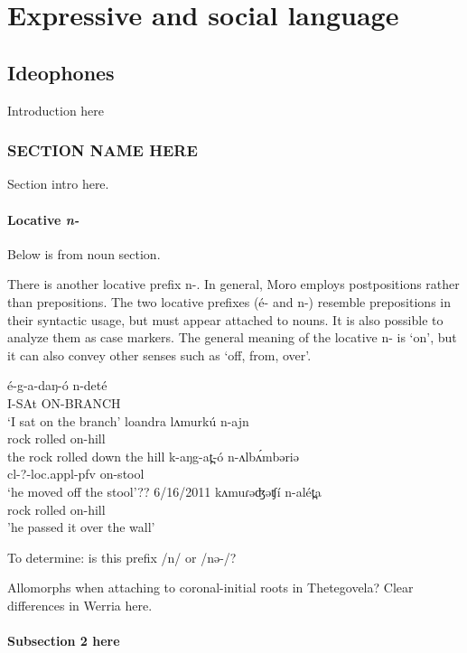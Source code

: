 \part{Expressive and social language}

\chapter{Ideophones}\label{chapter:ideophones}

Introduction here

\section{SECTION NAME HERE}

Section intro here.

\subsection{Locative \textit{n-}}

Below is from noun section.

There is another locative prefix n-. In general, Moro employs postpositions rather than prepositions. The two locative prefixes (é- and n-) resemble prepositions in their syntactic usage, but must appear attached to nouns. It is also possible to analyze them as case markers. The general meaning of the locative n- is `on’, but it can also convey other senses such as `off, from, over’.  

\ea 
	\ea \gll é-g-a-daŋ-ó n-deté		\\	
			I-SAt ON-BRANCH\\
		\glt `I sat on the branch'	
	\ex \gll loandra lʌmurkú n-ajn		 \\
			rock rolled on-hill\\
		\glt the rock rolled down the hill
	\ex \gll k-aŋg-at̪-ó n-ʌlbʌ́mbəriə	\\	
			cl-?-loc.appl-pfv on-stool\\
	\glt 	`he moved off the stool'??	6/16/2011 %
	\ex		kʌmuɾəʤəʧí n-alét̪a	\\
			rock rolled on-hill\\
			'he passed it over the wall'
	\z
\z 

To determine: is this prefix /n/ or /nə-/?

Allomorphs when attaching to coronal-initial roots in Thetegovela? Clear differences in Werria here.

\subsection{Subsection 2 here}

